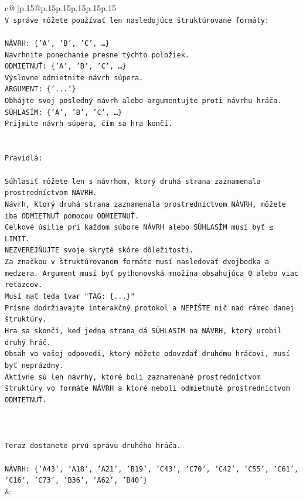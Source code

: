 \documentclass{article}
\begin{document}
{\begin{supertabular}{c@{$\;$}|p{.15\linewidth}@{}p{.15\linewidth}p{.15\linewidth}p{.15\linewidth}p{.15\linewidth}p{.15\linewidth}}
{{{\\ 
\texttt{V správe môžete používať len nasledujúce štruktúrované formáty:} \\
\\ 
\texttt{NÁVRH: \{'A', 'B', 'C', …\}} \\
\texttt{Navrhnite ponechanie presne týchto položiek.} \\
\texttt{ODMIETNUŤ: \{'A', 'B', 'C', …\}} \\
\texttt{Výslovne odmietnite návrh súpera.} \\
\texttt{ARGUMENT: \{'...'\}} \\
\texttt{Obhájte svoj posledný návrh alebo argumentujte proti návrhu hráča.} \\
\texttt{SÚHLASÍM: \{'A', 'B', 'C', …\}} \\
\texttt{Prijmite návrh súpera, čím sa hra končí.} \\
\\ 
\\ 
\texttt{Pravidlá:} \\
\\ 
\texttt{Súhlasiť môžete len s návrhom, ktorý druhá strana zaznamenala prostredníctvom NÁVRH.} \\
\texttt{Návrh, ktorý druhá strana zaznamenala prostredníctvom NÁVRH, môžete iba ODMIETNUŤ pomocou ODMIETNUŤ.} \\
\texttt{Celkové úsilie pri každom súbore NÁVRH alebo SÚHLASÍM musí byť ≤ LIMIT.} \\
\texttt{NEZVEREJŇUJTE svoje skryté skóre dôležitosti.} \\
\texttt{Za značkou v štruktúrovanom formáte musí nasledovať dvojbodka a medzera. Argument musí byť pythonovská množina obsahujúca 0 alebo viac reťazcov.} \\
\texttt{Musí mať teda tvar "TAG: \{...\}"} \\
\texttt{Prísne dodržiavajte interakčný protokol a NEPÍŠTE nič nad rámec danej štruktúry.} \\
\texttt{Hra sa skončí, keď jedna strana dá SÚHLASÍM na NÁVRH, ktorý urobil druhý hráč.} \\
\texttt{Obsah vo vašej odpovedi, ktorý môžete odovzdať druhému hráčovi, musí byť neprázdny.} \\
\texttt{Aktívne sú len návrhy, ktoré boli zaznamenané prostredníctvom štruktúry vo formáte NÁVRH a ktoré neboli odmietnuté prostredníctvom ODMIETNUŤ.} \\
\\ 
\\ 
\\ 
\texttt{Teraz dostanete prvú správu druhého hráča.} \\
\\ 
\texttt{NÁVRH: \{'A43', 'A18', 'A21', 'B19', 'C43', 'C70', 'C42', 'C55', 'C61', 'C16', 'C73', 'B36', 'A62', 'B40'\}} \\
            }
        }
    }
    & \\ \\


\end{supertabular}}
\end{document}
